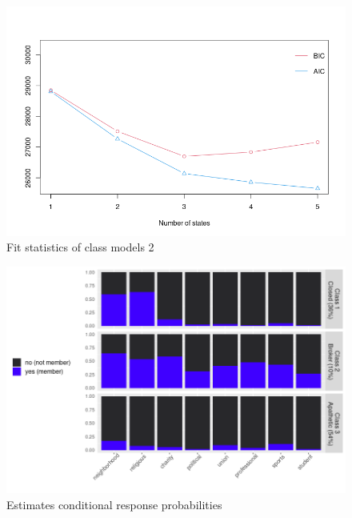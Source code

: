 \begin{figure}[htp]
    \centering
    \includegraphics[width=15cm]{output/plot_fit.png}
    \caption{Fit statistics of class models 2}
    \label{fig:galaxy}
\end{figure}


\begin{figure}[htp]
    \centering
    \includegraphics[width=15cm]{output/plot_latentclass.png}
    \caption{Estimates conditional response probabilities}
    \label{fig:galaxy}
\end{figure}


